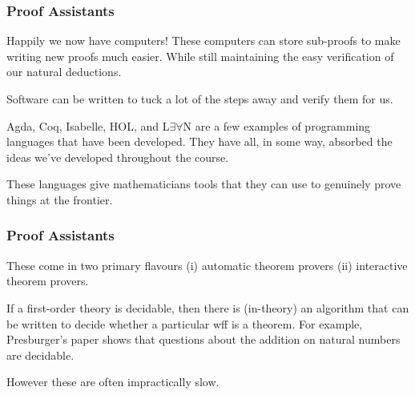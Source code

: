 \documentclass{beamer}
\begin{document}
\begin{frame}
	\frametitle{Proof Assistants}
	
	Happily we now have computers! These computers can store sub-proofs to make writing new proofs much easier. While still maintaining the easy verification of our natural deductions. 
	
	\vspace{0.2cm} 
	
	Software can be written to tuck a lot of the steps away and verify them for us. 
	
	\vspace{0.2cm}
	
	Agda, Coq, Isabelle, HOL, and L$\exists\forall$N are a few examples of programming languages that have been developed. They have all, in some way, absorbed the ideas we've developed throughout the course. 
	
	\vspace{0.2cm}
	
	These languages give mathematicians tools that they can use to genuinely prove things at the frontier. 
	
\end{frame}

\begin{frame}
	\frametitle{Proof Assistants}
	
	These come in two primary flavours (i) automatic theorem provers (ii) interactive theorem provers. 
	
	\vspace{0.2cm}
	
	If a first-order theory is decidable, then there is (in-theory) an algorithm that can be written to decide whether a particular wff is a theorem. For example, Presburger's paper shows that questions about the addition on natural numbers are decidable. 
	
	\vspace{0.2cm}
	
	However these are often impractically slow. 
	
\end{frame}
\end{document}
